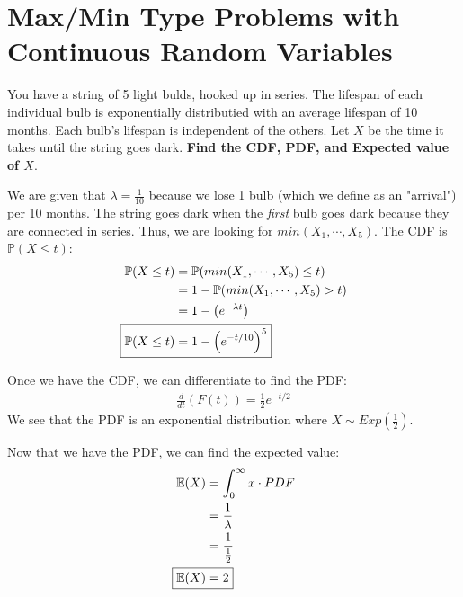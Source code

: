\documentclass[titlepage, 12pt, leqno]{article}
\begin{document}
\section{Max/Min Type Problems with Continuous Random Variables}
\begin{ex}
    You have a string of 5 light bulds, hooked up in series. The lifespan of each 
    individual bulb is exponentially distributied with an average lifespan of 10
    months. Each bulb's lifespan is independent of the others. Let $X$ be the time
    it takes until the string goes dark. \textbf{Find the CDF, PDF, and Expected
    value of $X$}.
    \vspace{10px}
    
    We are given that $\lambda = \frac{1}{10}$ because we lose 1 bulb (which we 
    define as an "arrival") per 10 months. The string goes dark when the 
    \textit{first} bulb goes dark because they are connected in series. Thus, we
    are looking for $min(X_1, \cdots ,X_5)$. The CDF is $\mathbb{P}(X\le t)$:
    \begin{align*}
       \mathbb{P}(X\le t) &= \mathbb{P}(min(X_1, \cdots ,X_5) \le t) \\
                          &= 1 - \mathbb{P}(min(X_1, \cdots ,X_5) > t) \\
                          &= 1 - \left(e^{-\lambda t} \right) \\
       \Aboxed{\mathbb{P}(X \le t) &= 1 - \left(e^{-t/10}\right)^5} 
    \end{align*}
    \vspace{10px}
    
    Once we have the CDF, we can differentiate to find the PDF:
    \begin{align*}
       \frac{d}{dt}\left(F(t)\right) = \frac{1}{2}e^{-t/2}
    \end{align*}
    We see that the PDF is an exponential distribution where $X \sim Exp\left(
    \frac{1}{2}\right)$.

    Now that we have the PDF, we can find the expected value:
    \begin{align*}
        \mathbb{E}(X) &= \int_{0}^{\infty}x \cdot PDF \\
                      &= \frac{1}{\lambda} \\
                      &= \frac{1}{\frac{1}{2}} \\
        \Aboxed{ \mathbb{E}(X) &= 2} 
    \end{align*}
\end{ex}
\end{document}
